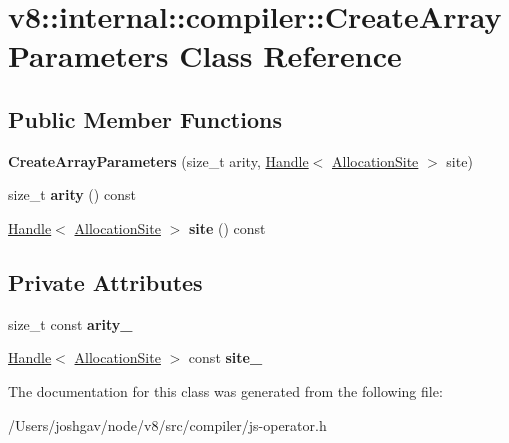 \hypertarget{classv8_1_1internal_1_1compiler_1_1_create_array_parameters}{}\section{v8\+:\+:internal\+:\+:compiler\+:\+:Create\+Array\+Parameters Class Reference}
\label{classv8_1_1internal_1_1compiler_1_1_create_array_parameters}
\subsection*{Public Member Functions}
\begin{DoxyCompactItemize}
\item 
{\bfseries Create\+Array\+Parameters} (size\+\_\+t arity, \hyperlink{classv8_1_1internal_1_1_handle}{Handle}$<$ \hyperlink{classv8_1_1internal_1_1_allocation_site}{Allocation\+Site} $>$ site)\hypertarget{classv8_1_1internal_1_1compiler_1_1_create_array_parameters_a8a7492dad8b5a6ccd37c48795434f5c1}{}\label{classv8_1_1internal_1_1compiler_1_1_create_array_parameters_a8a7492dad8b5a6ccd37c48795434f5c1}

\item 
size\+\_\+t {\bfseries arity} () const \hypertarget{classv8_1_1internal_1_1compiler_1_1_create_array_parameters_a87e2c6cfa6d812893ad5b4840cf63d91}{}\label{classv8_1_1internal_1_1compiler_1_1_create_array_parameters_a87e2c6cfa6d812893ad5b4840cf63d91}

\item 
\hyperlink{classv8_1_1internal_1_1_handle}{Handle}$<$ \hyperlink{classv8_1_1internal_1_1_allocation_site}{Allocation\+Site} $>$ {\bfseries site} () const \hypertarget{classv8_1_1internal_1_1compiler_1_1_create_array_parameters_aca71cd8e08c50b51d65874759086351a}{}\label{classv8_1_1internal_1_1compiler_1_1_create_array_parameters_aca71cd8e08c50b51d65874759086351a}

\end{DoxyCompactItemize}
\subsection*{Private Attributes}
\begin{DoxyCompactItemize}
\item 
size\+\_\+t const {\bfseries arity\+\_\+}\hypertarget{classv8_1_1internal_1_1compiler_1_1_create_array_parameters_ad2e747ee45850367bf37dd20d271d459}{}\label{classv8_1_1internal_1_1compiler_1_1_create_array_parameters_ad2e747ee45850367bf37dd20d271d459}

\item 
\hyperlink{classv8_1_1internal_1_1_handle}{Handle}$<$ \hyperlink{classv8_1_1internal_1_1_allocation_site}{Allocation\+Site} $>$ const {\bfseries site\+\_\+}\hypertarget{classv8_1_1internal_1_1compiler_1_1_create_array_parameters_a6c64d0ee3d66a5e780500275e470ddf5}{}\label{classv8_1_1internal_1_1compiler_1_1_create_array_parameters_a6c64d0ee3d66a5e780500275e470ddf5}

\end{DoxyCompactItemize}


The documentation for this class was generated from the following file\+:\begin{DoxyCompactItemize}
\item 
/\+Users/joshgav/node/v8/src/compiler/js-\/operator.\+h\end{DoxyCompactItemize}
